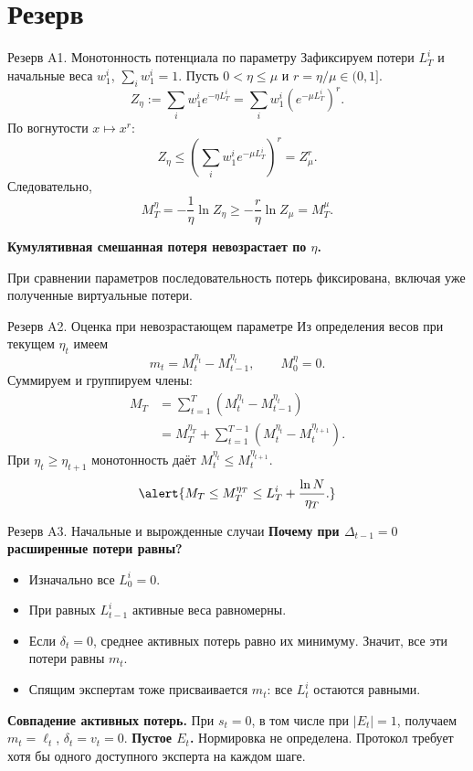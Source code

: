 \documentclass[11pt,aspectratio=169]{beamer}
\begin{document}
\section{Резерв}
\begin{frame}{Резерв A1. Монотонность потенциала по параметру}
  Зафиксируем потери $L_T^i$ и начальные веса $w_1^i$, $\sum_iw_1^i=1$.
  Пусть $0<\eta\le\mu$ и $r=\eta/\mu\in(0,1]$.
  \[
    Z_\eta:=\sum_i w_1^i e^{-\eta L_T^i}
       =\sum_i w_1^i\left(e^{-\mu L_T^i}\right)^r.
  \]
  По вогнутости $x\mapsto x^r$:
  \[Z_\eta\le\left(\sum_i w_1^i e^{-\mu L_T^i}\right)^r=Z_\mu^r.\]
  Следовательно,
  \[
    M_T^\eta=-\frac1\eta\ln Z_\eta
       \ge-\frac r\eta\ln Z_\mu=M_T^\mu.
  \]
  \par\medskip\textbf{Кумулятивная смешанная потеря невозрастает по $\eta$.}
  \par\vfill{\scriptsize При сравнении параметров последовательность потерь фиксирована, включая уже полученные виртуальные потери.\par}
\end{frame}

\begin{frame}{Резерв A2. Оценка при невозрастающем параметре}
  Из определения весов при текущем $\eta_t$ имеем
  \[m_t=M_t^{\eta_t}-M_{t-1}^{\eta_t},\qquad M_0^\eta=0.\]
  Суммируем и группируем члены:
  \begin{align*}
    M_T
      &=\sum_{t=1}^T\left(M_t^{\eta_t}-M_{t-1}^{\eta_t}\right)\\
      &=M_T^{\eta_T}
         +\sum_{t=1}^{T-1}\left(M_t^{\eta_t}-M_t^{\eta_{t+1}}\right).
  \end{align*}
  При $\eta_t\ge\eta_{t+1}$ монотонность даёт
  $M_t^{\eta_t}\le M_t^{\eta_{t+1}}$.
  \[\alert{M_T\le M_T^{\eta_T}\le L_T^i+\frac{\ln N}{\eta_T}.}\]
\end{frame}

\begin{frame}{Резерв A3. Начальные и вырожденные случаи}
  \textbf{Почему при $\Delta_{t-1}=0$ расширенные потери равны?}
  \begin{itemize}
    \item Изначально все $L_0^i=0$.
    \item При равных $L_{t-1}^i$ активные веса равномерны.
    \item Если $\delta_t=0$, среднее активных потерь равно их минимуму.
          Значит, все эти потери равны $m_t$.
    \item Спящим экспертам тоже присваивается $m_t$:
          все $L_t^i$ остаются равными.
  \end{itemize}
  \medskip
  \textbf{Совпадение активных потерь.}
  При $s_t=0$, в том числе при $|E_t|=1$, получаем
  $m_t=\ell_t$, $\delta_t=v_t=0$.
  \medskip
  \textbf{Пустое $E_t$.} Нормировка не определена.
  Протокол требует хотя бы одного доступного эксперта на каждом шаге.
\end{frame}
\end{document}
